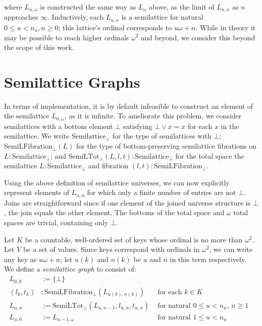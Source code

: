 \documentclass{article}
\begin{document}
      where $L_{u, \omega}$ is constructed the same way as $L_{\omega}$ above, as the limit of $L_{u, n}$ as $n$ approaches $\infty$. Inductively, each $L_{u, n}$ is a semilattice for natural $0 \leq u < n_u, n \geq 0$; this lattice's ordinal corresponds to $u \omega + n$. While in theory it may be possible to reach higher ordinals $\omega^2$ and beyond, we consider this beyond the scope of this work.

    \section{Semilattice Graphs}

      In terms of implementation, it is by default infeasible to construct an element of the semilattice $L_{0, \omega}$, as it is infinite. To ameliorate this problem, we consider semilattices with a bottom element $\bot$ satisfying $\bot \vee x = x$ for each $x$ in the semilattice. We write $\mathrm{Semilattice}_\bot$ for the type of semilattices with $\bot$; $\mathrm{SemiLFibration}_\bot(L)$ for the type of bottom-preserving semilattice fibrations on $L : \mathrm{Semilattice}_\bot$; and $\mathrm{SemiLTot}_\bot(L, l, t) : \mathrm{Semilattice}_\bot$ for the total space the semilattice $L : \mathrm{Semilattice}_\bot$ and fibration $(l, t) : \mathrm{SemiLFibration}_\bot$.

      Using the above definition of semilattice universes, we can now explicitly represent elements of $L_{u, n}$ for which only a finite number of entries are not $\bot$. Joins are straightforward since if one element of the joined universe structure is $\bot$, the join equals the other element. The bottoms of the total space and $\omega$ total spaces are trivial, containing only $\bot$.

      Let $K$ be a countable, well-ordered set of keys whose ordinal is no more than $\omega^2$. Let $V$ be a set of values. Since keys correspond with ordinals in $\omega^2$, we can write any key as $u\omega + n$; let $u(k)$ and $n(k)$ be $u$ and $n$ in this term respectively. We define a \emph{semilattice graph} to consist of:
      \begin{align*}
        L_{0, 0} &:= \{ \bot \} \\
        (l_k, t_k) &: \mathrm{SemiLFibration}_\bot(L_{u(k), n(k)}) & \text{ for each $k \in K$ } \\
        L_{u, n} &:= \mathrm{SemiLTot}_\bot(L_{u, n-1}, l_{u, n}, t_{u, n})    & \text{ for natural $0 \leq u < n_u$, $n \geq 1$ } \\
        L_{u, 0} &:= L_{u-1, \omega} & \text{ for natural $1 \leq u < n_u$ }
      \end{align*}
\end{document}
